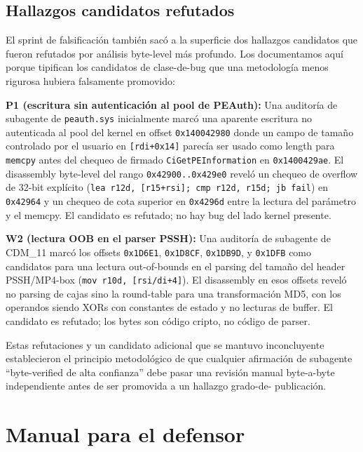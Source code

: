 \documentclass[11pt,letterpaper]{article}
\let\oldsection\section
\renewcommand{\section}{\clearpage\oldsection}
\begin{document}
\subsection{Hallazgos candidatos refutados}
\label{sec:robustness-refuted}

El sprint de falsificación también sacó a la superficie dos
hallazgos candidatos que fueron refutados por análisis byte-level
más profundo. Los documentamos aquí porque tipifican los
candidatos de clase-de-bug que una metodología menos rigurosa
hubiera falsamente promovido:

\textbf{P1 (escritura sin autenticación al pool de PEAuth):}
Una auditoría de subagente de \texttt{peauth.sys} inicialmente
marcó una aparente escritura no autenticada al pool del kernel
en offset \texttt{0x140042980} donde un campo de tamaño
controlado por el usuario en \texttt{[rdi+0x14]} parecía ser
usado como length para \texttt{memcpy} antes del chequeo de
firmado \texttt{CiGetPEInformation} en \texttt{0x1400429ae}. El
disassembly byte-level del rango \texttt{0x42900..0x429e0}
reveló un chequeo de overflow de 32-bit explícito
(\texttt{lea r12d, [r15+rsi]; cmp r12d, r15d; jb fail}) en
\texttt{0x42964} y un chequeo de cota superior en
\texttt{0x4296d} entre la lectura del parámetro y el memcpy. El
candidato es refutado; no hay bug del lado kernel presente.

\textbf{W2 (lectura OOB en el parser PSSH):} Una auditoría de
subagente de CDM\_11 marcó los offsets \texttt{0x1D6E1},
\texttt{0x1D8CF}, \texttt{0x1DB9D}, y \texttt{0x1DFB} como
candidatos para una lectura out-of-bounds en el parsing del
tamaño del header PSSH/MP4-box
(\texttt{mov r10d, [r{si/di}+4]}). El disassembly en esos
offsets reveló no parsing de cajas sino la round-table para una
transformación MD5, con los operandos siendo XORs con constantes
de estado y no lecturas de buffer. El candidato es refutado; los
bytes son código cripto, no código de parser.

Estas refutaciones y un candidato adicional que se mantuvo
inconcluyente establecieron el principio metodológico de que
cualquier afirmación de subagente ``byte-verified de alta
confianza'' debe pasar una revisión manual byte-a-byte
independiente antes de ser promovida a un hallazgo grado-de-
publicación.

\section{Manual para el defensor}
\label{sec:defender}
\end{document}
